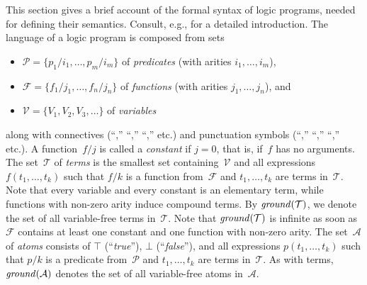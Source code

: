 This section gives a brief account of the formal syntax of logic programs,
needed for defining their semantics.
Consult, e.g., \cite{lloyd87a} for a detailed introduction.
The language of a logic program is composed from sets
%
\begin{itemize}
\item $\mathcal{P}=\{p_1/i_1,\dots,p_m/i_m\}$ of \emph{predicates}
      (with arities $i_1,\dots,i_m$),
\item $\mathcal{F}=\{f_1/j_1,\dots,f_n/j_n\}$ of \emph{functions}
      (with arities $j_1,\dots,j_n$), and
\item $\mathcal{V}=\{V_1,V_2,V_3,\dots\}$ of \emph{variables}
\end{itemize}
along with connectives (``\code{:-},'' ``\code{,},'' ``,'' etc.) and
punctuation symbols (``\code{(},'' ``\code{)},'' ``,'' etc.).
A function~$f/j$ is called a \emph{constant} if $j=0$, that is,
if~$f$ has no arguments.
The set~$\mathcal{T}$ of \emph{terms} is the smallest set containing~$\mathcal{V}$
and all expressions $f(t_1,\dots,t_k)$ such that $f/k$ is a function 
from~$\mathcal{F}$ and $t_1,\dots,t_k$ are terms in~$\mathcal{T}$.
Note that every variable and every constant is an elementary term,
while functions with non-zero arity induce compound terms.
By $\mathit{ground}(\mathcal{T})$, we denote the set of all variable-free
terms in~$\mathcal{T}$.
Note that $\mathit{ground}(\mathcal{T})$ is infinite
as soon as~$\mathcal{F}$ contains at least one constant and one function
with non-zero arity.
The set~$\mathcal{A}$ of \emph{atoms} consists of 
$\top$ (``\textit{true}''), $\bot$ (``\textit{false}''), and all expressions
$p(t_1,\dots,t_k)$ such that $p/k$ is a predicate
from~$\mathcal{P}$ and $t_1,\dots,t_k$ are terms in~$\mathcal{T}$.
As with terms, $\mathit{ground}(\mathcal{A})$ denotes the set of all variable-free
atoms in~$\mathcal{A}$.

